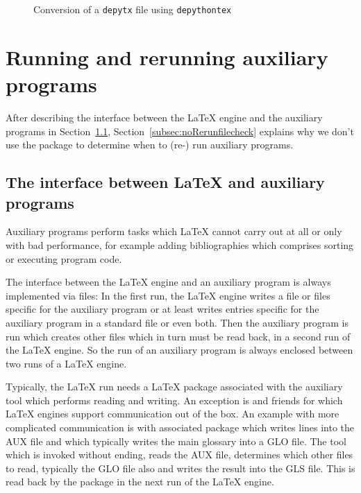   \begin{figure}[!htb]
    \centering
    \caption{\label{fig:depy2out}Conversion of a \texttt{depytx} file using \texttt{depythontex}}
    \end{figure}
  
\section{Running and rerunning auxiliary programs}%
\label{sec:runRerunAux}

After describing the interface 
between the \LaTeX{} engine and the auxiliary programs 
in Section~\ref{subsec:latexAux}, 
Section~\ref{subsec:noRerunfilecheck} explains 
why we don't use the package  
to determine when to (re-) run auxiliary programs. 


\subsection{The interface between \LaTeX{} and auxiliary programs}%
\label{subsec:latexAux}

Auxiliary programs perform tasks which \LaTeX{} cannot carry out at all 
or only with bad performance, 
for example adding bibliographies which comprises sorting 
or executing program code. 

The interface between the \LaTeX{} engine and an auxiliary program 
is always implemented via files: 
In the first run, the \LaTeX{} engine writes a file or files 
specific for the auxiliary program 
or at least writes entries specific for the auxiliary program 
in a standard file or even both. 
Then the auxiliary program is run which creates other files 
which in turn must be read back, in a second run of the \LaTeX{} engine. 
So the run of an auxiliary program 
is always enclosed between two runs of a \LaTeX{} engine. 

Typically, the \LaTeX{} run needs a \LaTeX{} package 
associated with the auxiliary tool 
which performs reading and writing. 
An exception is  and friends 
for which \LaTeX{} engines support communication out of the box. 
An example with more complicated communication 
is  with associated package  
which writes lines into the AUX file 
and which typically writes the main glossary into a GLO file. 
The tool  which is invoked without ending, 
reads the AUX file, determines which other files to read, 
typically the GLO file also 
and writes the result into the GLS file. 
This is read back by the package  
in the next run of the \LaTeX{} engine. 


